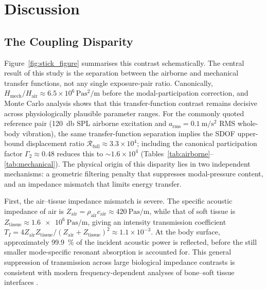 \section{Discussion}
\label{sec:discussion}

\subsection{The Coupling Disparity}
\label{sec:disc:disparity}



Figure~\ref{fig:stick_figure} summarises this contrast schematically.  The
central result of this study is the separation between the airborne and
mechanical transfer functions, not any single exposure-pair ratio.
Canonically, $H_\mathrm{mech}/H_\mathrm{air}
\approx 6.5 \times 10^6\,\si{\pascal\second\squared\per\metre}$ before the
modal-participation correction, and Monte Carlo analysis shows that this
transfer-function contrast remains decisive across physiologically plausible
parameter ranges.  For the commonly quoted reference pair
(\SI{120}{\decibel} SPL airborne excitation and
$a_\mathrm{rms} = \SI{0.1}{\metre\per\second\squared}$ RMS whole-body
vibration), the same transfer-function separation implies the SDOF upper-bound
displacement ratio $\mathcal{R}_\mathrm{full} \approx 3.3 \times 10^4$;
including the canonical participation factor $\Gamma_2 \approx 0.48$ reduces
this to $\sim 1.6 \times 10^4$
(Tables~\ref{tab:airborne}--\ref{tab:mechanical}).  The physical origin of
this disparity lies in two independent mechanisms: a geometric filtering
penalty that suppresses modal-pressure content, and an impedance mismatch
that limits energy transfer.

First, the air--tissue impedance mismatch is severe.  The specific acoustic
impedance of air is $Z_{\mathrm{air}} = \rho_{\mathrm{air}} c_{\mathrm{air}}
\approx \SI{420}{\pascal\second\per\metre}$, while that of soft tissue is
$Z_{\mathrm{tissue}} \approx \SI{1.6e6}{\pascal\second\per\metre}$, giving
an intensity transmission coefficient
$T_I = 4 Z_{\mathrm{air}} Z_{\mathrm{tissue}} /
(Z_{\mathrm{air}} + Z_{\mathrm{tissue}})^2 \approx 1.1 \times 10^{-3}$.
At the body surface, approximately \SI{99.9}{\percent} of the incident
acoustic power is reflected, before the still smaller mode-specific resonant
absorption is accounted for.  This general suppression of transmission across large biological
impedance contrasts is consistent with modern frequency-dependent analyses of
bone--soft tissue interfaces \cite{Gupta2021}.

